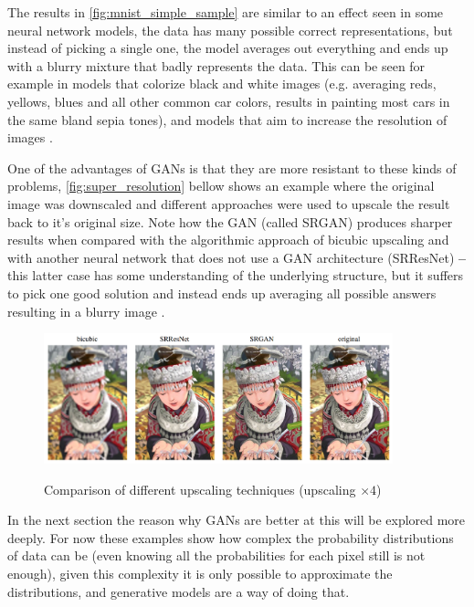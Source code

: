 The results in \autoref{fig:mnist_simple_sample} are similar to an effect seen in some neural network models, the data has many possible correct representations, but instead of picking a single one, the model averages out everything and ends up with a blurry mixture that badly represents the data. This can be seen for example in models that colorize black and white images \cite{automaticColorization2016} (e.g. averaging reds, yellows, blues and all other common car colors, results in painting most cars in the same bland sepia tones), and models that aim to increase the resolution of images \cite{ganSuperResolution2016}.

One of the advantages of \acp{GAN} is that they are more resistant to these kinds of problems, \autoref{fig:super_resolution} bellow shows an example where the original image was downscaled and different approaches were used to upscale the result back to it's original size. Note how the \gls{GAN} (called SRGAN) produces sharper results when compared with the algorithmic approach of bicubic upscaling and with another neural network that does not use a \gls{GAN} architecture (SRResNet) \textbf{--} this latter case has some understanding of the underlying structure, but it suffers to pick one good solution and instead ends up averaging all possible answers resulting in a blurry image \cite{nipsGAN2017}.
\begin{figure}[hbt]
    \centering
    \caption{Comparison of different upscaling techniques (upscaling $\times4$)}
    \includegraphics[width=0.9\textwidth]{chapters/GANs/figures/superResolution.png}
    \label{fig:super_resolution}
\end{figure}

In the next section the reason why \acp{GAN} are better at this will be explored more deeply. For now these examples show how complex the probability distributions of data can be (even knowing all the probabilities for each pixel still is not enough), given this complexity it is only possible to approximate the distributions, and generative models are a way of doing that.

